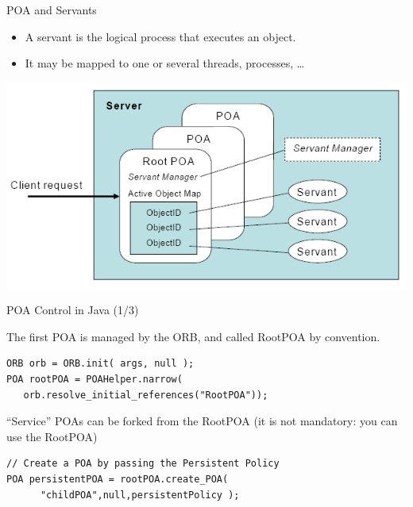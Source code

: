 \documentclass[bigger,hyperref={colorlinks=true, urlcolor=red, plainpages=false, pdfpagelabels, bookmarksnumbered}]{beamer}
\begin{document}
\begin{frame}[label=sec-4-16]{POA and Servants}
\begin{itemize}
\item A servant is the logical process that executes an object.
\item It may be mapped to one or several threads, processes, \ldots{}
\end{itemize}
\includegraphics[width=.9\linewidth]{./img/POA.png}
\end{frame}

\begin{frame}[fragile,label=sec-4-17]{POA Control in Java (1/3)}
 \begin{block}{The first POA is managed by the ORB, and called RootPOA by convention.}
\lstset{language=java,label= ,caption= ,numbers=none}
\begin{lstlisting}
ORB orb = ORB.init( args, null );
POA rootPOA = POAHelper.narrow(
   orb.resolve_initial_references("RootPOA"));
\end{lstlisting}
\end{block}

\begin{block}{“Service” POAs can be forked from the RootPOA (it is not mandatory: you can use}
the RootPOA)
\lstset{language=java,label= ,caption= ,numbers=none}
\begin{lstlisting}
// Create a POA by passing the Persistent Policy
POA persistentPOA = rootPOA.create_POA(
      "childPOA",null,persistentPolicy );
\end{lstlisting}
\end{block}
\end{frame}
\end{document}

